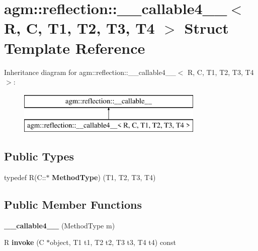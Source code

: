 \hypertarget{structagm_1_1reflection_1_1____callable4____}{}\section{agm\+:\+:reflection\+:\+:\+\_\+\+\_\+callable4\+\_\+\+\_\+$<$ R, C, T1, T2, T3, T4 $>$ Struct Template Reference}
\label{structagm_1_1reflection_1_1____callable4____}
Inheritance diagram for agm\+:\+:reflection\+:\+:\+\_\+\+\_\+callable4\+\_\+\+\_\+$<$ R, C, T1, T2, T3, T4 $>$\+:\begin{figure}[H]
\begin{center}
\leavevmode
\includegraphics[height=2.000000cm]{structagm_1_1reflection_1_1____callable4____}
\end{center}
\end{figure}
\subsection*{Public Types}
\begin{DoxyCompactItemize}
\item 
typedef R(C\+::$\ast$ {\bfseries Method\+Type}) (T1, T2, T3, T4)\hypertarget{structagm_1_1reflection_1_1____callable4_____a577250c9f9f5ca97bdb69bd7138c93c6}{}\label{structagm_1_1reflection_1_1____callable4_____a577250c9f9f5ca97bdb69bd7138c93c6}

\end{DoxyCompactItemize}
\subsection*{Public Member Functions}
\begin{DoxyCompactItemize}
\item 
{\bfseries \+\_\+\+\_\+callable4\+\_\+\+\_\+} (Method\+Type m)\hypertarget{structagm_1_1reflection_1_1____callable4_____af6d5b0f3047df79a7c313357b254ed17}{}\label{structagm_1_1reflection_1_1____callable4_____af6d5b0f3047df79a7c313357b254ed17}

\item 
R {\bfseries invoke} (C $\ast$object, T1 t1, T2 t2, T3 t3, T4 t4) const \hypertarget{structagm_1_1reflection_1_1____callable4_____a5c36ef3a62bdd6c800ec81a42061e0c0}{}\label{structagm_1_1reflection_1_1____callable4_____a5c36ef3a62bdd6c800ec81a42061e0c0}

\end{DoxyCompactItemize}

